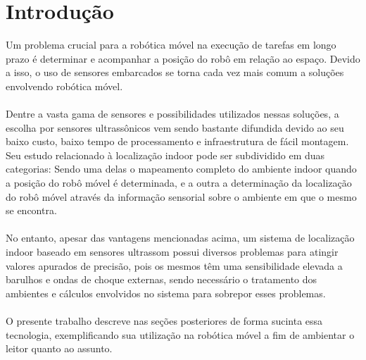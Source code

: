 \chapter{Introdução}
\label{chap:intro}


Um problema crucial para a robótica móvel na execução de tarefas em longo prazo é determinar e acompanhar a posição do robô em relação ao espaço. Devido a isso, o uso de sensores embarcados se torna cada vez mais comum a soluções envolvendo robótica móvel.\\
\\
Dentre a vasta gama de sensores e possibilidades utilizados nessas soluções, a escolha por sensores ultrassônicos vem sendo bastante difundida devido ao seu baixo custo, baixo tempo de processamento e infraestrutura de fácil montagem. Seu estudo relacionado à localização indoor pode ser subdividido em duas categorias: Sendo uma delas o mapeamento completo do ambiente indoor quando a posição do robô móvel é determinada, e a outra a determinação da localização do robô móvel através da informação sensorial sobre o ambiente em que o mesmo se encontra.\\
\\
No entanto, apesar das vantagens mencionadas acima, um sistema de localização indoor baseado em sensores ultrassom possui diversos problemas para atingir valores apurados de precisão, pois os mesmos têm uma sensibilidade elevada a barulhos e ondas de choque externas, sendo necessário o tratamento dos ambientes e cálculos envolvidos no sistema para sobrepor esses problemas.\\
\\
O presente trabalho descreve nas seções posteriores de forma sucinta essa tecnologia, exemplificando sua utilização na robótica móvel a fim de ambientar o leitor quanto ao assunto.\\


\ \\
